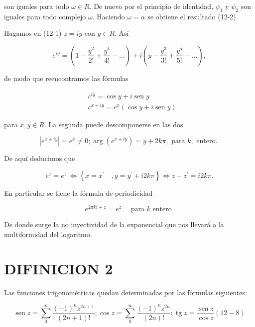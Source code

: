\documentclass[10pt]{article}
\theoremstyle{plain}
\theoremstyle{definition}
\theoremstyle{remark}
\begin{document}
son iguales para todo $\omega \in R$. De nuevo por el principio de identidad, $\psi_{1}$ y $\psi_{2}$ son iguales para todo complejo $\omega$. Haciendo $\omega=\alpha$ se obtiene el resultado (12-2).

Hagamos en (12-1) $z=i y$ con $y \in R$. Así

$$
e^{i y}=\left(1-\frac{y^{2}}{2!}+\frac{y^{4}}{4!}-\ldots\right)+i\left(y-\frac{y^{3}}{3!}+\frac{y^{5}}{5!}-\ldots\right),
$$

de modo que reencontramos las fórmulas


\begin{align*}
& c^{i y}=\cos y+i \operatorname{sen} y  \tag{$12\cdot3$}\\
& c^{x+i y}=c^{x}(\cos y+i \operatorname{sen} y) \tag{$12\cdot4$}
\end{align*}


para $x, y \in R$. La segunda puede descomponerse en las dos


\begin{equation*}
\left|e^{x+i y}\right|=e^{x} \neq 0 ; \arg \left(e^{x+i y}\right)=y+2 k \pi, \text { para } k, \text { entero. } \tag{12-5}
\end{equation*}


De aquí deducimos que


\begin{equation*}
e^{z}=e^{z^{\prime}} \Longleftrightarrow\left\{x=x^{\prime} \quad, y=y^{\prime}+i 2 k \pi\right\} \Longleftrightarrow z-z^{\prime}=i 2 k \pi . \tag{12-6}
\end{equation*}


En particular se tiene la fórmula de periodicidad


\begin{equation*}
e^{2 \pi k i+z}=e^{z} \quad \text { para } k \text { entero } \tag{12-7}
\end{equation*}


De donde surge la no inyectividad de la exponencial que nos llevará a la multiformidad del logaritmo.

\section*{DIFINICION 2}
Las funciones trigonométricas quedan determinadas por las fórmulas siguientes:

$$
\operatorname{sen} z=\sum_{0}^{\infty} \frac{(-1)^{n} z^{2 n+1}}{(2 n+1)!} ; \cos z=\sum_{0}^{\infty} \frac{(-1)^{n} z^{2 n}}{(2 n)!} ; \operatorname{tg} z=\frac{\operatorname{sen} z}{\cos z}(12-8)
$$
\end{document}

